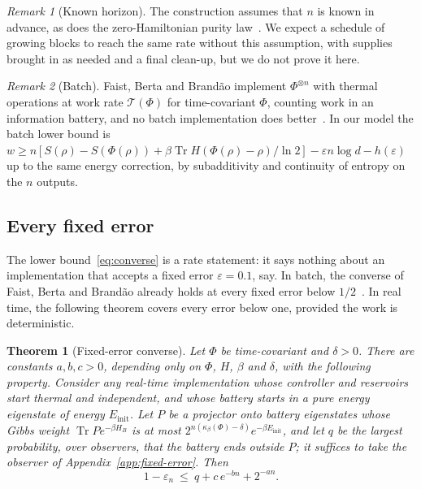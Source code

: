 \documentclass[11pt]{article}
\newtheorem{theorem}{Theorem}
\theoremstyle{definition}
\theoremstyle{remark}
\newtheorem{remark}{Remark}
\newcommand{\Tr}{\operatorname{Tr}}
\newcommand{\Tcap}{\mathcal T}
\newcommand{\Trt}{\kappa_\beta}
\begin{document}
\begin{remark}[Known horizon]
The construction assumes that $n$ is known in advance, as does the zero-Hamiltonian purity law~\cite{ClosedMemory}. We expect a schedule of growing blocks to reach the same rate without this assumption, with supplies brought in as needed and a final clean-up, but we do not prove it here.
\end{remark}

\begin{remark}[Batch]
Faist, Berta and Brand\~ao implement $\Phi^{\otimes n}$ with thermal operations at work rate $\Tcap(\Phi)$ for time-covariant $\Phi$, counting work in an information battery, and no batch implementation does better~\cite[Thm.~7.1, Prop.~4.2]{FBB21}. In our model the batch lower bound is $w\ge n[S(\rho)-S(\Phi(\rho))+\beta\Tr H(\Phi(\rho)-\rho)/\ln2]-\varepsilon n\log d-h(\varepsilon)$ up to the same energy correction, by subadditivity and continuity of entropy on the $n$ outputs.
\end{remark}

\subsection{Every fixed error}\label{sec:fixed-error}

The lower bound~\eqref{eq:converse} is a rate statement: it says nothing about an implementation that accepts a fixed error $\varepsilon=0.1$, say. In batch, the converse of Faist, Berta and Brand\~ao already holds at every fixed error below $1/2$~\cite[Prop.~4.2]{FBB21}. In real time, the following theorem covers every error below one, provided the work is deterministic.

\begin{theorem}[Fixed-error converse]\label{thm:fixed-error}
Let $\Phi$ be time-covariant and $\delta>0$. There are constants $a,b,c>0$, depending only on $\Phi$, $H$, $\beta$ and $\delta$, with the following property. Consider any real-time implementation whose controller and reservoirs start thermal and independent, and whose battery starts in a pure energy eigenstate of energy $E_{\mathrm{init}}$. Let $P$ be a projector onto battery eigenstates whose Gibbs weight $\Tr Pe^{-\beta H_B}$ is at most $2^{n(\Trt(\Phi)-\delta)}e^{-\beta E_{\mathrm{init}}}$, and let $q$ be the largest probability, over observers, that the battery ends outside $P$; it suffices to take the observer of Appendix~\ref{app:fixed-error}. Then
\[
1-\varepsilon_n\ \le\ q+c\,e^{-bn}+2^{-an}.
\]
\end{theorem}
\end{document}
